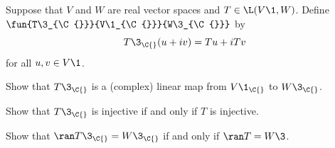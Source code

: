 \exercise
Suppose that $V$ and $W$ are real vector spaces and $T \in \L(V\1, W)$. Define $\fun {T\3_{\C{}}} {V\1_{\C{}}} {W\3_{\C{}}}$ by\label{3complexMap}
\[
T\3_{\C{}}(u + iv) = Tu + iTv
\]
for all $u, v \in V\1$.
\begin{subtheorem}
\item
Show that $T\3_{\C{}}$ is a (complex) linear map from $V\1_{\C{}}$ to $W\3_{\C{}}$.
\item
Show that $T\3_{\C{}}$ is injective if and only if $T$ is injective.
\item
Show that $\ran T\3_{\C{}} = W\3_{\C{}}$ if and only if $\ran T = W\3$.
\end{subtheorem}

